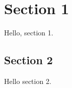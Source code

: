 \section{Section 1}\label{section-1}

Hello, section 1.

\subsection{Section 2}\label{section-2}

Hello section 2.
